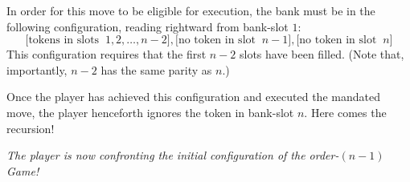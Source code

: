 \noindent
In order for this move to be eligible for execution, the bank must be in the following configuration, reading rightward from bank-slot $1$:
\[ \big[ \mbox{tokens in slots } \ 1, 2, \ldots, n-2 \big],
 \big[ \mbox{no token in slot } \ n-1 \big],
 \big[ \mbox{no token in slot } \ n \big]
\]
This configuration requires that the first $n-2$ slots have been filled.  (Note that, importantly, $n-2$ has the same parity as $n$.)

\smallskip

Once the player has achieved this configuration and executed the mandated move, the player henceforth ignores the token in bank-slot $n$.   Here comes the recursion!

\medskip

{\em The player is now confronting the initial configuration of the order-$(n-1)$ Game!}

\medskip


